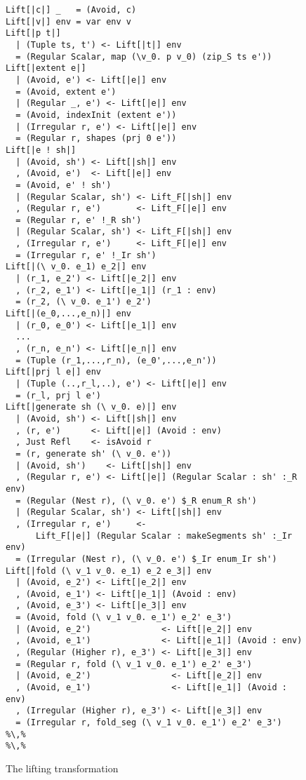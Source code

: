 \begin{figure}
\begin{lstlisting}[basicstyle=\footnotesize\ttfamily,multicols=2,style=ndp]
Lift[|c|] _   = (Avoid, c)
Lift[|v|] env = var env v
Lift[|p t|]
  | (Tuple ts, t') <- Lift[|t|] env
  = (Regular Scalar, map (\v_0. p v_0) (zip_S ts e'))
Lift[|extent e|]
  | (Avoid, e') <- Lift[|e|] env
  = (Avoid, extent e')
  | (Regular _, e') <- Lift[|e|] env
  = (Avoid, indexInit (extent e'))
  | (Irregular r, e') <- Lift[|e|] env
  = (Regular r, shapes (prj 0 e'))
Lift[|e ! sh|]
  | (Avoid, sh') <- Lift[|sh|] env
  , (Avoid, e')  <- Lift[|e|] env
  = (Avoid, e' ! sh')
  | (Regular Scalar, sh') <- Lift_F[|sh|] env
  , (Regular r, e')       <- Lift_F[|e|] env
  = (Regular r, e' !_R sh')
  | (Regular Scalar, sh') <- Lift_F[|sh|] env
  , (Irregular r, e')     <- Lift_F[|e|] env
  = (Irregular r, e' !_Ir sh')
Lift[|(\ v_0. e_1) e_2|] env
  | (r_1, e_2') <- Lift[|e_2|] env
  , (r_2, e_1') <- Lift[|e_1|] (r_1 : env)
  = (r_2, (\ v_0. e_1') e_2')
Lift[|(e_0,...,e_n)|] env
  | (r_0, e_0') <- Lift[|e_1|] env
  ...
  , (r_n, e_n') <- Lift[|e_n|] env
  = (Tuple (r_1,...,r_n), (e_0',...,e_n'))
Lift[|prj l e|] env
  | (Tuple (..,r_l,..), e') <- Lift[|e|] env
  = (r_l, prj l e')
Lift[|generate sh (\ v_0. e)|] env
  | (Avoid, sh') <- Lift[|sh|] env
  , (r, e')      <- Lift[|e|] (Avoid : env)
  , Just Refl    <- isAvoid r
  = (r, generate sh' (\ v_0. e'))
  | (Avoid, sh')    <- Lift[|sh|] env
  , (Regular r, e') <- Lift[|e|] (Regular Scalar : sh' :_R env)
  = (Regular (Nest r), (\ v_0. e') $_R enum_R sh')
  | (Regular Scalar, sh') <- Lift[|sh|] env
  , (Irregular r, e')     <-
      Lift_F[|e|] (Regular Scalar : makeSegments sh' :_Ir env)
  = (Irregular (Nest r), (\ v_0. e') $_Ir enum_Ir sh')
Lift[|fold (\ v_1 v_0. e_1) e_2 e_3|] env
  | (Avoid, e_2') <- Lift[|e_2|] env
  , (Avoid, e_1') <- Lift[|e_1|] (Avoid : env)
  , (Avoid, e_3') <- Lift[|e_3|] env
  = (Avoid, fold (\ v_1 v_0. e_1') e_2' e_3')
  | (Avoid, e_2')              <- Lift[|e_2|] env
  , (Avoid, e_1')              <- Lift[|e_1|] (Avoid : env)
  , (Regular (Higher r), e_3') <- Lift[|e_3|] env
  = (Regular r, fold (\ v_1 v_0. e_1') e_2' e_3')
  | (Avoid, e_2')                <- Lift[|e_2|] env
  , (Avoid, e_1')                <- Lift[|e_1|] (Avoid : env)
  , (Irregular (Higher r), e_3') <- Lift[|e_3|] env
  = (Irregular r, fold_seg (\ v_1 v_0. e_1') e_2' e_3')
%\,%
%\,%
\end{lstlisting}
\caption{The lifting transformation}
\label{fig:lifting-transform}
\end{figure}

